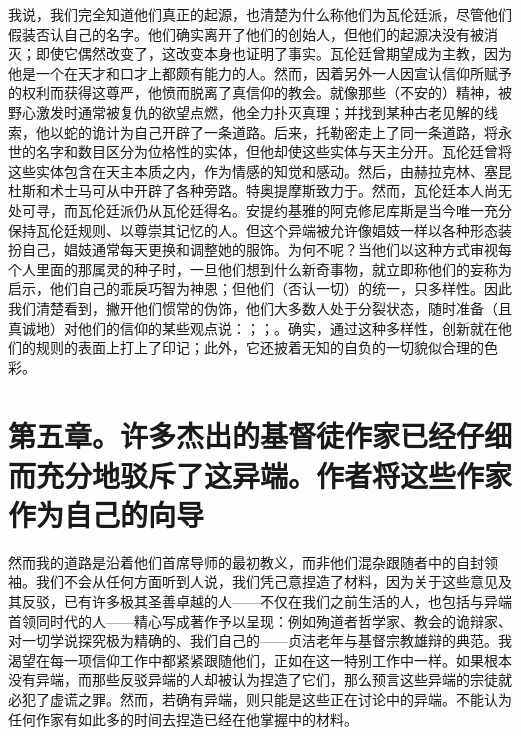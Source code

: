 我说，我们完全知道他们真正的起源，也清楚为什么称他们为瓦伦廷派，尽管他们假装否认自己的名字。他们确实离开了他们的创始人，但他们的起源决没有被消灭；即使它偶然改变了，这改变本身也证明了事实。瓦伦廷曾期望成为主教，因为他是一个在天才和口才上都颇有能力的人。然而，因着另外一人因宣认信仰所赋予的权利而获得这尊严，他愤而脱离了真信仰的教会。就像那些（不安的）精神，被野心激发时通常被复仇的欲望点燃，他全力扑灭真理；并找到某种古老见解的线索，他以蛇的诡计为自己开辟了一条道路。后来，托勒密走上了同一条道路，将永世的名字和数目区分为位格性的实体，但他却使这些实体与天主分开。瓦伦廷曾将这些实体包含在天主本质之内，作为情感的知觉和感动。然后，由赫拉克林、塞昆杜斯和术士马可从中开辟了各种旁路。特奥提摩斯致力于。然而，瓦伦廷本人尚无处可寻，而瓦伦廷派仍从瓦伦廷得名。安提约基雅的阿克修尼库斯是当今唯一充分保持瓦伦廷规则、以尊崇其记忆的人。但这个异端被允许像娼妓一样以各种形态装扮自己，娼妓通常每天更换和调整她的服饰。为何不呢？当他们以这种方式审视每个人里面的那属灵的种子时，一旦他们想到什么新奇事物，就立即称他们的妄称为启示，他们自己的乖戾巧智为神恩；但他们（否认一切）的统一，只多样性。因此我们清楚看到，撇开他们惯常的伪饰，他们大多数人处于分裂状态，随时准备（且真诚地）对他们的信仰的某些观点说：；；。确实，通过这种多样性，创新就在他们的规则的表面上打上了印记；此外，它还披着无知的自负的一切貌似合理的色彩。\par


\section{第五章。许多杰出的基督徒作家已经仔细而充分地驳斥了这异端。作者将这些作家作为自己的向导}

然而我的道路是沿着他们首席导师的最初教义，而非他们混杂跟随者中的自封领袖。我们不会从任何方面听到人说，我们凭己意捏造了材料，因为关于这些意见及其反驳，已有许多极其圣善卓越的人——不仅在我们之前生活的人，也包括与异端首领同时代的人——精心写成著作予以呈现：例如殉道者哲学家、教会的诡辩家、对一切学说探究极为精确的、我们自己的——贞洁老年与基督宗教雄辩的典范。我渴望在每一项信仰工作中都紧紧跟随他们，正如在这一特别工作中一样。如果根本没有异端，而那些反驳异端的人却被认为捏造了它们，那么预言这些异端的宗徒就必犯了虚谎之罪。然而，若确有异端，则只能是这些正在讨论中的异端。不能认为任何作家有如此多的时间去捏造已经在他掌握中的材料。\par

